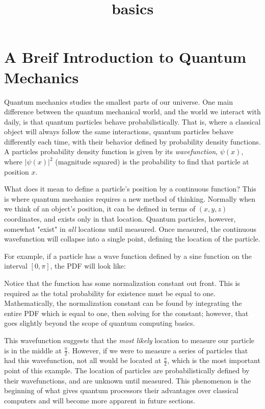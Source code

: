 \documentclass[11pt]{article}
\title{basics}
\begin{document}
    
    
    \maketitle
    
    

    
    \section{A Breif Introduction to Quantum
Mechanics}\label{a-breif-introduction-to-quantum-mechanics}

    Quantum mechanics studies the smallest parts of our universe. One main
difference between the quantum mechanical world, and the world we
interact with daily, is that quantum particles behave probabilistically.
That is, where a classical object will always follow the same
interactions, quantum particles behave differently each time, with their
behavior defined by probability density functions. A particles
probability density function is given by its \emph{wavefunction},
\(\psi(x)\), where \(|\psi(x)|^2\) (magnitude squared) is the
probability to find that particle at position \(x\).

What does it mean to define a particle's position by a continuous
function? This is where quantum mechanics requires a new method of
thinking. Normally when we think of an object's position, it can be
defined in terms of \((x, y, z)\) coordinates, and exists only in that
location. Quantum particles, however, somewhat "exist" in \emph{all}
locations until measured. Once measured, the continuous wavefunction
will collapse into a single point, defining the location of the
particle.

For example, if a particle has a wave function defined by a sine
function on the interval \([0, \pi]\), the PDF will look like:

    Notice that the function has some normalization constant out front. This
is required as the total probability for existence must be equal to one.
Mathematically, the normalization constant can be found by integrating
the entire PDF which is equal to one, then solving for the constant;
however, that goes slightly beyond the scope of quantum computing
basics.

This wavefunction suggests that the \emph{most likely} location to
measure our particle is in the middle at \(\frac{\pi}{2}\). However, if
we were to measure a series of particles that had this wavefunction, not
all would be located at \(\frac{\pi}{2}\), which is the most important
point of this example. The location of particles are probabilistically
defined by their wavefunctions, and are unknown until measured. This
phenomenon is the beginning of what gives quantum processors their
advantages over classical computers and will become more apparent in
future sections.
\end{document}
